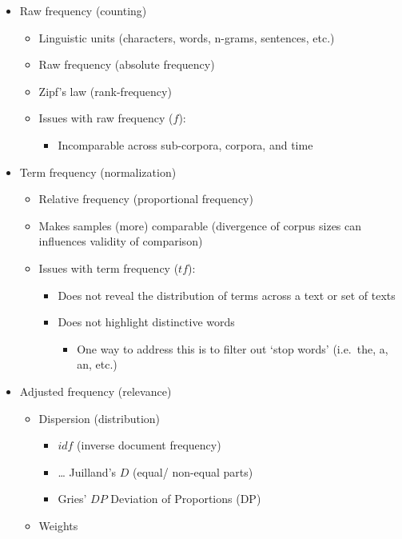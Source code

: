 \documentclass[
  letterpaper,
]{scrbook}
\providecommand{\tightlist}{%
  \setlength{\itemsep}{0pt}\setlength{\parskip}{0pt}}\usepackage{longtable,booktabs,array}
\begin{document}
\begin{itemize}
\tightlist
\item
  Raw frequency (counting)

  \begin{itemize}
  \tightlist
  \item
    Linguistic units (characters, words, n-grams, sentences, etc.)
  \item
    Raw frequency (absolute frequency)
  \item
    Zipf's law (rank-frequency)
  \item
    Issues with raw frequency (\(f\)):

    \begin{itemize}
    \tightlist
    \item
      Incomparable across sub-corpora, corpora, and time
    \end{itemize}
  \end{itemize}
\item
  Term frequency (normalization)

  \begin{itemize}
  \tightlist
  \item
    Relative frequency (proportional frequency)
  \item
    Makes samples (more) comparable (divergence of corpus sizes can
    influences validity of comparison)
  \item
    Issues with term frequency (\(tf\)):

    \begin{itemize}
    \tightlist
    \item
      Does not reveal the distribution of terms across a text or set of
      texts
    \item
      Does not highlight distinctive words

      \begin{itemize}
      \tightlist
      \item
        One way to address this is to filter out `stop words' (i.e.~the,
        a, an, etc.)
      \end{itemize}
    \end{itemize}
  \end{itemize}
\item
  Adjusted frequency (relevance)

  \begin{itemize}
  \tightlist
  \item
    Dispersion (distribution)

    \begin{itemize}
    \tightlist
    \item
      \(idf\) (inverse document frequency)
    \item
      \ldots{} Juilland's \(D\) (equal/ non-equal parts)
    \item
      Gries' \(DP\) Deviation of Proportions (DP)
    \end{itemize}
  \item
    Weights


\end{itemize}
\end{itemize}
\end{document}
